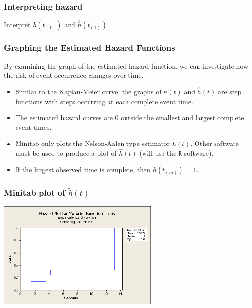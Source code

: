 \begin{frame}
\frametitle{Interpreting hazard}
Interpret $\tilde{h}(t_{(1)})$ and $\hat{h}(t_{(1)})$.
\vskip300pt
\end{frame}

\begin{frame}
\frametitle{Graphing the Estimated Hazard Functions}
By examining the graph of the estimated hazard function, we can investigate how the risk of event occurrence changes over time.
\begin{itemize}
\item Similar to the Kaplan-Meier curve, the graphs of $\tilde{h}(t)$ and $\hat{h}(t)$ are step functions with
steps occurring at each complete event time.

\item The estimated hazard curves are 0 outside the smallest and largest complete event times.

\item Minitab only plots the Nelson-Aalen type estimator $\tilde{h}(t)$. Other software must be used to produce
a plot of $\hat{h}(t)$ (will use the \texttt{R} software).

\item If the largest observed time is complete, then $\tilde{h}(t_{(m)})=1$.
\end{itemize}
\end{frame}

\begin{frame}
\frametitle{Minitab plot of $\tilde{h}(t)$}
\includegraphics[width=0.60\textwidth]{Figures/NA_haz.jpg}
\end{frame}

